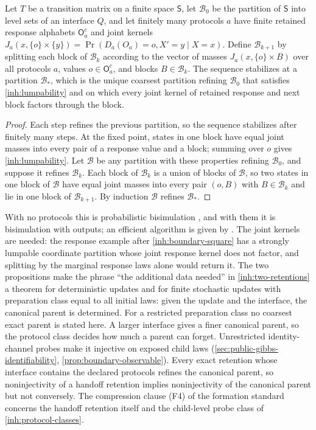 Let $T$ be a transition matrix on a finite space $\mathsf S$, let
$\mathcal B_0$ be the partition of $\mathsf S$ into level sets of an
interface $Q$, and let finitely many protocols $a$ have finite retained
response alphabets $\mathsf O_a^c$ and joint kernels
$J_a(x,\{o\}\times\{y\})=\Pr(D_a(O_a)=o,X'=y\mid X=x)$. Define
$\mathcal B_{k+1}$ by splitting each block of $\mathcal B_k$ according to
the vector of masses $J_a(x,\{o\}\times B)$ over all protocols $a$, values
$o\in\mathsf O_a^c$, and blocks $B\in\mathcal B_k$.
The sequence stabilizes at a partition $\mathcal B_*$, which is the unique
coarsest partition refining $\mathcal B_0$ that satisfies
\cref{inh:lumpability} and on which every joint kernel of retained response
and next block factors through the block.
\begin{proof}
Each step refines the previous partition, so the sequence stabilizes after
finitely many steps. At the fixed point, states in one block have equal
joint masses into every pair of a response value and a block; summing over
$o$ gives \cref{inh:lumpability}. Let $\mathcal B$ be any partition with
these properties refining $\mathcal B_0$, and suppose it refines
$\mathcal B_k$. Each block of $\mathcal B_k$ is a union of blocks of
$\mathcal B$, so two states in one block of $\mathcal B$ have equal joint
masses into every pair $(o,B)$ with $B\in\mathcal B_k$ and lie in one block
of $\mathcal B_{k+1}$. By induction $\mathcal B$ refines $\mathcal B_*$.
\end{proof}

With no protocols this is probabilistic bisimulation \citep{LarsenSkou1991},
and with them it is bisimulation with outputs; an efficient algorithm is
given by \citet{DerisaviHermannsSanders2003}. The joint kernels are needed:
the response example after \cref{inh:boundary-square} has a strongly
lumpable coordinate partition whose joint response kernel does not factor,
and splitting by the marginal response laws alone would return it. The two
propositions make the phrase ``the additional data needed'' in
\cref{inh:two-retentions} a theorem for deterministic updates and for finite
stochastic updates with preparation class equal to all initial laws: given
the update and the interface, the canonical parent is determined. For a
restricted preparation class no coarsest exact parent is stated here. A
larger interface gives a finer canonical parent, so the protocol class
decides how much a parent can forget. Unrestricted identity-channel probes
make it injective on exposed child laws
(\cref{sec:public-gibbs-identifiability}, \cref{prop:boundary-observable}).
Every exact retention whose interface contains the declared protocols
refines the canonical parent, so noninjectivity of a handoff retention
implies noninjectivity of the canonical parent but not conversely. The
compression clause (F4) of the formation standard concerns the handoff
retention itself and the child-level probe class of
\cref{inh:protocol-classes}.

